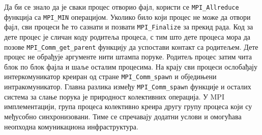 Да би се знало да је сваки процес отворио фајл, користи се \texttt{MPI\_Allreduce} функција са \texttt{MPI\_MIN} операцијом. Уколико било који процес не може да отвори фајл, сви процеси ће то сазнати и позвати 
\texttt{MPI\_Finalize} за прекид рада. Код за дете процес је сличан коду родитеља процеса, с тим што дете процеса мора да позове \texttt{MPI\_Comm\_get\_parent} функцију да успостави контакт са родитељем. Дете процес не обрађује аргументе нити штампа поруке. Родитељ процес затим чита блок по блок фајла и шаље осталим процесима. На крају сви процеси ослобађају интеркомуникатор креиран од стране  \texttt{MPI\_Comm\_spawn} и обједињени интракомуникатор. Главна разлика између \texttt{MPI\_Comm\_spawn} функције и осталих  система за слање порука је природност колективних операција. У MPI имплементацији, група процеса колективно креира другу групу процеса који су међусобно синхронизовани. Тиме се спречавају додатни услови и омогућава неопходна комуникациона инфраструктура.

